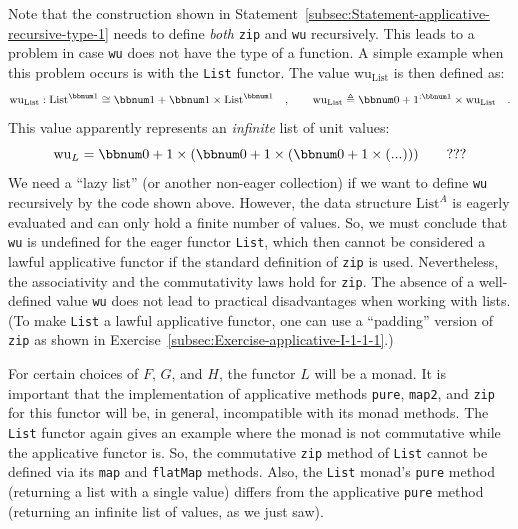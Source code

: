 Note that the construction shown in Statement~\ref{subsec:Statement-applicative-recursive-type-1}
needs to define \emph{both} \lstinline!zip! and \lstinline!wu! recursively.
This leads to a problem in case \lstinline!wu! does not have the
type of a function. A simple example when this problem occurs is with
the \lstinline!List! functor. The value $\text{wu}_{\text{List}}$
is then defined as:
\[
\text{wu}_{\text{List}}:\text{List}^{\bbnum 1}\cong\bbnum 1+\bbnum 1\times\text{List}^{\bbnum 1}\quad,\quad\quad\text{wu}_{\text{List}}\triangleq\bbnum 0+1^{:\bbnum 1}\times\text{wu}_{\text{List}}\quad.
\]
This value apparently represents an \emph{infinite} list of unit values:
\[
\text{wu}_{L}=\bbnum 0+1\times\left(\bbnum 0+1\times\left(\bbnum 0+1\times\left(...\right)\right)\right)\quad\quad???
\]
We need a \textsf{``}lazy list\textsf{''} (or another non-eager
collection) if we want to define \lstinline!wu! recursively by the
code shown above. However, the data structure $\text{List}^{A}$ is
eagerly evaluated and can only hold a finite number of values. So,
we must conclude that \lstinline!wu! is undefined for the eager functor
\lstinline!List!, which then cannot be considered a lawful applicative
functor if the standard definition of \lstinline!zip! is used. Nevertheless,
the associativity and the commutativity laws hold for \lstinline!zip!.
The absence of a well-defined value \lstinline!wu! does not lead
to practical disadvantages when working with lists. (To make \lstinline!List!
a lawful applicative functor, one can use a \textsf{``}padding\textsf{''} version
of \lstinline!zip! as shown
in Exercise~\ref{subsec:Exercise-applicative-I-1-1-1}.)

For certain choices of $F$, $G$, and $H$, the functor $L$ will
be a monad. It is important that the implementation of applicative
methods \lstinline!pure!, \lstinline!map2!, and \lstinline!zip!
for this functor will be, in general, incompatible with its monad
methods. The \lstinline!List! functor again gives an example where
the monad is not commutative while the applicative functor is. So,
the commutative \lstinline!zip! method of \lstinline!List! cannot
be defined via its \lstinline!map! and \lstinline!flatMap! methods.
Also, the \lstinline!List! monad\textsf{'}s \lstinline!pure! method (returning
a list with a single value) differs from the applicative \lstinline!pure!
method (returning an infinite list of values, as we just saw).

